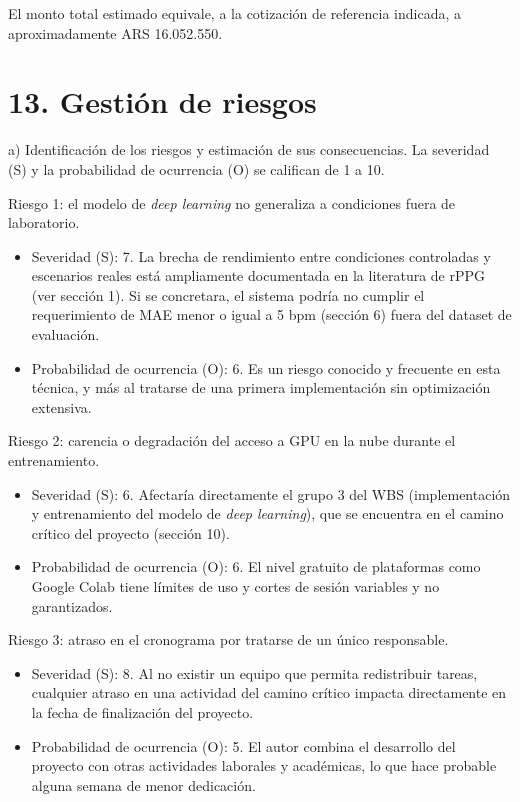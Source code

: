 \documentclass[
11pt, %
]{charter}
\begin{document}
	El monto total estimado equivale, a la cotización de referencia indicada, a aproximadamente ARS 16.052.550.
	
	
	\section{13. Gestión de riesgos}
	\label{sec:riesgos}
	
	a) Identificación de los riesgos y estimación de sus consecuencias. La severidad (S) y la probabilidad de ocurrencia (O) se califican de 1 a 10.
	
	Riesgo 1: el modelo de \textit{deep learning} no generaliza a condiciones fuera de laboratorio.
	\begin{itemize}
		\item Severidad (S): 7. La brecha de rendimiento entre condiciones controladas y escenarios reales está ampliamente documentada en la literatura de rPPG (ver sección 1). Si se concretara, el sistema podría no cumplir el requerimiento de MAE menor o igual a 5 bpm (sección 6) fuera del dataset de evaluación.
		\item Probabilidad de ocurrencia (O): 6. Es un riesgo conocido y frecuente en esta técnica, y más al tratarse de una primera implementación sin optimización extensiva.
	\end{itemize}
	
	Riesgo 2: carencia o degradación del acceso a GPU en la nube durante el entrenamiento.
	\begin{itemize}
		\item Severidad (S): 6. Afectaría directamente el grupo 3 del WBS (implementación y entrenamiento del modelo de \textit{deep learning}), que se encuentra en el camino crítico del proyecto (sección 10).
		\item Probabilidad de ocurrencia (O): 6. El nivel gratuito de plataformas como Google Colab tiene límites de uso y cortes de sesión variables y no garantizados.
	\end{itemize}
	
	Riesgo 3: atraso en el cronograma por tratarse de un único responsable.
	\begin{itemize}
		\item Severidad (S): 8. Al no existir un equipo que permita redistribuir tareas, cualquier atraso en una actividad del camino crítico impacta directamente en la fecha de finalización del proyecto.
		\item Probabilidad de ocurrencia (O): 5. El autor combina el desarrollo del proyecto con otras actividades laborales y académicas, lo que hace probable alguna semana de menor dedicación.
	\end{itemize}
	
\end{document}
